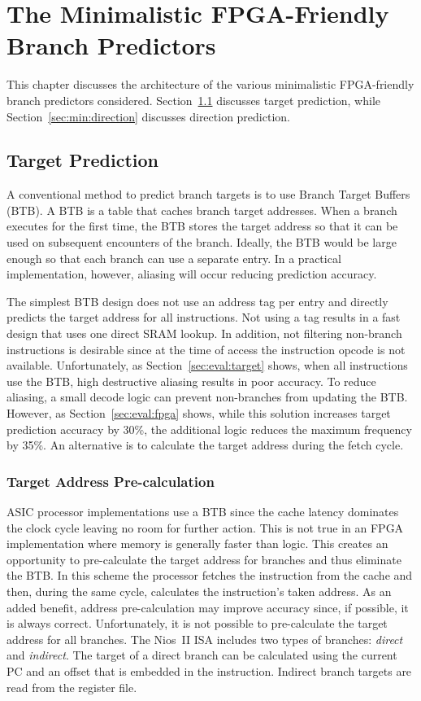 \chapter{The Minimalistic FPGA-Friendly Branch Predictors}
\label{chap:minimal}
This chapter discusses the architecture of the various minimalistic FPGA-friendly branch predictors considered. Section~\ref{sec:min:target} discusses target prediction, while Section~\ref{sec:min:direction} discusses direction prediction.

\section{Target Prediction}
\label{sec:min:target}
A conventional method to predict branch targets is to use Branch Target Buffers (BTB). A BTB is a table that caches branch target addresses. When a branch executes for the first time, the BTB stores the target address so that it can be used on subsequent encounters of the branch. Ideally, the BTB would be large enough so that each branch can use a separate entry. In a practical implementation, however, aliasing will occur reducing prediction accuracy.  

The simplest BTB design does not use an address tag per entry and directly predicts the target address for all instructions. Not using a tag results in a fast design that uses one direct SRAM lookup. In addition, not filtering non-branch instructions is desirable since at the time of access the instruction opcode is not available. Unfortunately, as Section~\ref{sec:eval:target} shows, when all instructions use the BTB, high destructive aliasing results in poor accuracy. To reduce aliasing, a small decode logic can prevent non-branches from updating the BTB. However, as Section~\ref{sec:eval:fpga} shows, while this solution increases target prediction accuracy by 30\%, the additional logic reduces the maximum frequency by 35\%. An alternative is to calculate the target address during the fetch cycle.

\subsection{Target Address Pre-calculation}
\label{sec:min:target:addrprecalc}

ASIC processor implementations use a BTB since the cache latency dominates the clock cycle leaving no room for further action. This is not true in an FPGA implementation where memory is generally faster than logic. This creates an opportunity to pre-calculate the target address for branches and thus eliminate the BTB. In this scheme the processor fetches the instruction from the cache and then, during the same cycle, calculates the instruction's taken address. As an added benefit, address pre-calculation may improve accuracy since, if possible, it is always correct. Unfortunately, it is not possible to pre-calculate the target address for all branches. The Nios~II ISA includes two types of branches: \textit{direct} and \textit{indirect}. The target of a direct branch can be calculated using the current PC and an offset that is embedded in the instruction. Indirect branch targets are read from the register file.  


